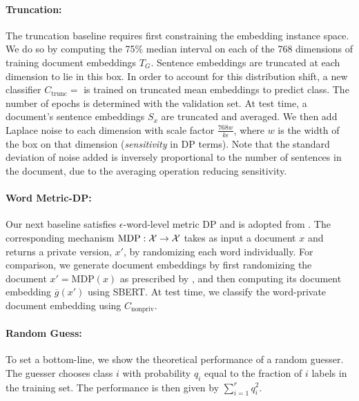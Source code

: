 \paragraph{Truncation:} The truncation baseline \cite{clifton} requires first constraining the embedding instance space. We do so by computing the 75\% median interval on each of the 768 dimensions of training document embeddings $T_G$. Sentence embeddings are truncated at each dimension to lie in this box. In order to account for this distribution shift, a new classifier $C_{\text{trunc}} = $  is trained on truncated mean embeddings to predict class. The number of epochs is determined with the validation set. At test time, a document's sentence embeddings $S_x$ are truncated and averaged. We then add Laplace noise to each dimension with scale factor $\frac{768 w}{k \epsilon}$, where $w$ is the width of the box on that dimension (\emph{sensitivity} in DP terms). Note that the standard deviation of noise added is inversely proportional to the number of sentences in the document, due to the averaging operation reducing sensitivity. 

\paragraph{Word Metric-DP:} Our next baseline satisfies $\epsilon$-word-level metric DP and is adopted from \cite{metricdp}. The corresponding mechanism $\text{MDP}: \mathcal{X} \rightarrow \mathcal{X}$ takes as input a document $x$ and returns a private version, $x'$, by randomizing each word individually. For comparison, we generate document embeddings by first randomizing the document $x' = \text{MDP}(x)$ as prescribed by \cite{metricdp}, and then computing its document embedding $\overline{g}(x')$ using SBERT. At test time, we classify the word-private document embedding using $C_{\text{nonpriv}}$. 

\paragraph{Random Guess:} To set a bottom-line, we show the theoretical performance of a random guesser. The guesser chooses class $i$ with probability $q_i$ equal to the fraction of $i$ labels in the training set. The performance is then given by $\sum_{i = 1}^{r} q_i^2$. 



